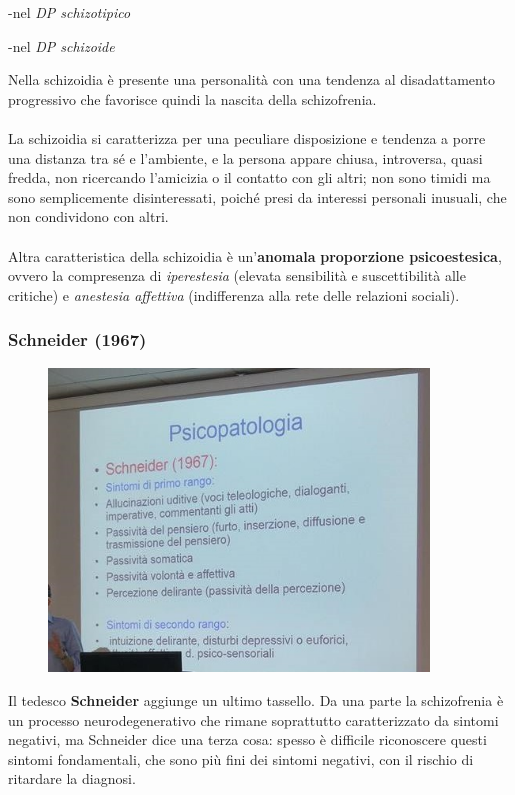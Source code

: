 -nel \emph{DP schizotipico}

-nel \emph{DP schizoide}

Nella schizoidia è presente una personalità con una tendenza al
disadattamento progressivo che favorisce quindi la nascita della
schizofrenia.
\\\\
La schizoidia si caratterizza per una peculiare disposizione e tendenza
a porre una distanza tra sé e l'ambiente, e la persona appare chiusa,
introversa, quasi fredda, non ricercando l'amicizia o il contatto con
gli altri; non sono timidi ma sono semplicemente disinteressati, poiché
presi da interessi personali inusuali, che non condividono con altri.
\\\\
Altra caratteristica della schizoidia è un'\textbf{anomala}
\textbf{proporzione psicoestesica}, ovvero la compresenza di
\emph{iperestesia} (elevata sensibilità e suscettibilità alle critiche)
e \emph{anestesia affettiva} (indifferenza alla rete delle relazioni
sociali).

\subsubsection{Schneider (1967)}

\begin{figure}[!ht]
\centering
	\includegraphics[width=0.9\textwidth]{06/image3.jpeg}
\end{figure}

Il tedesco \textbf{Schneider} aggiunge un ultimo tassello. Da una parte
la schizofrenia è un processo neurodegenerativo che rimane soprattutto
caratterizzato da sintomi negativi, ma Schneider dice una terza cosa:
spesso è difficile riconoscere questi sintomi fondamentali, che sono più
fini dei sintomi negativi, con il rischio di ritardare la diagnosi.

